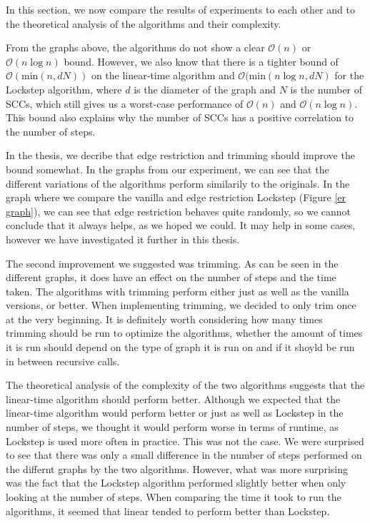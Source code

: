 \documentclass[../master/master.tex]{subfiles}
\begin{document}
In this section, we now compare the results of experiments to each other and to the theoretical analysis of the algorithms and their complexity.

From the graphs above, the algorithms do not show a clear $\mathcal{O}(n)$ or $\mathcal{O}(n\log n)$ bound. However, we also know that there is a tighter bound of $\mathcal{O}(\text{min}(n, dN))$ on the linear-time algorithm and $\mathcal{O}(\text{min}(n\log n, dN)$ for the Lockstep algorithm, where $d$ is the diameter of the graph and $N$ is the number of SCCs, which still gives us a worst-case performance of $\mathcal{O}(n)$ and $\mathcal{O}(n\log n)$. This bound also explains why the number of SCCs has a positive correlation to the number of steps.

In the thesis, we decribe that edge restriction and trimming should improve the bound somewhat. In the graphs from our experiment, we can see that the different variations of the algorithms perform similarily to the originals. In the graph where we compare the vanilla and edge restriction Lockstep (Figure \ref{er graph}), we can see that edge restriction behaves quite randomly, so we cannot conclude that it always helps, as we hoped we could. It may help in some cases, however we have investigated it further in this thesis.

The second improvement we suggested was trimming. As can be seen in the different graphs, it does have an effect on the number of steps and the time taken. The algorithms with trimming perform either just as well as the vanilla versions, or better. When implementing trimming, we decided to only trim once at the very beginning. It is definitely worth considering how many times trimming should be run to optimize the algorithms, whether the amount of times it is run should depend on the type of graph it is run on and if it shoyld be run in between recursive calls.

The theoretical analysis of the complexity of the two algorithms suggests that the linear-time algorithm should perform better. Although we expected that the linear-time algorithm would perform better or just as well as Lockstep in the number of steps, we thought it would perform worse in terms of runtime, as Lockstep is used more often in practice. This was not the case. We were surprised to see that there was only a small difference in the number of steps performed on the differnt graphs by the two algorithms. However, what was more surprising was the fact that the Lockstep algorithm performed slightly better when only looking at the number of steps. When comparing the time it took to run the algorithms, it seemed that linear tended to perform better than Lockstep.
\end{document}
